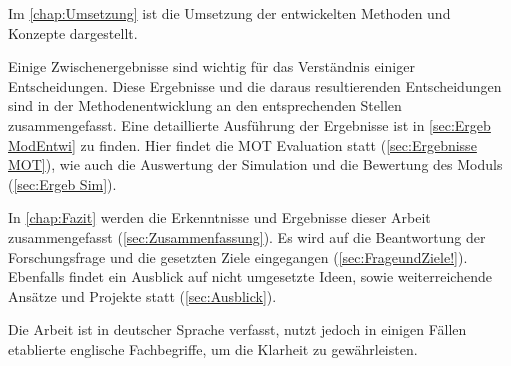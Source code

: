 Im \autoref{chap:Umsetzung} ist die Umsetzung der entwickelten Methoden und Konzepte dargestellt. \par

Einige Zwischenergebnisse sind wichtig für das Verständnis einiger Entscheidungen. Diese Ergebnisse und die daraus resultierenden Entscheidungen sind in der Methodenentwicklung an den entsprechenden Stellen zusammengefasst. Eine detaillierte Ausführung der Ergebnisse ist in \autoref{sec:Ergeb ModEntwi} zu finden. Hier findet die MOT Evaluation statt (\autoref{sec:Ergebnisse MOT}), wie auch die Auswertung der Simulation und die Bewertung des Moduls (\autoref{sec:Ergeb Sim}). \par

In \autoref{chap:Fazit} werden die Erkenntnisse und Ergebnisse dieser Arbeit zusammengefasst (\autoref{sec:Zusammenfassung}). Es wird auf die Beantwortung der Forschungsfrage und die gesetzten Ziele eingegangen (\autoref{sec:FrageundZiele!}). Ebenfalls findet ein Ausblick auf nicht umgesetzte Ideen, sowie weiterreichende Ansätze und Projekte statt (\autoref{sec:Ausblick}).

Die Arbeit ist in deutscher Sprache verfasst, nutzt jedoch in einigen Fällen etablierte englische Fachbegriffe, um die Klarheit zu gewährleisten.  \par


